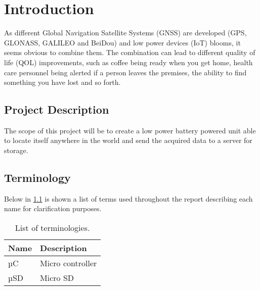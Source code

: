
\chapter{Introduction}
\label{sec:introduction}
As different Global Navigation Satellite Systems (GNSS) are developed (GPS, GLONASS, GALILEO and BeiDou) and low power devices (IoT) blooms, it seems obvious to combine them.
The combination can lead to different quality of life (QOL) improvements, such as coffee being ready when you get home, health care personnel being alerted if a person leaves the premises, the ability to find something you have lost and so forth.

\section{Project Description}
\label{sec:projectDescription}
The scope of this project will be to create a low power battery powered unit able to locate itself anywhere in the world and send the acquired data to a server for storage.

\section{Terminology}
\label{sec:terminology}
Below in \cref{tab:terminology} is shown a list of terms used throughout the report describing each name for clarification purposes.

\begin{table}[H]
	\centering
	\begin{tabularx}{0.8\textwidth}{l X}
		\toprule
		\textbf{Name} & \textbf{Description} \\
		\midrule
		µC & Micro controller \\
		µSD & Micro SD \\
		\bottomrule
	\end{tabularx}
	\caption{List of terminologies.}
	\label{tab:terminology}
\end{table}